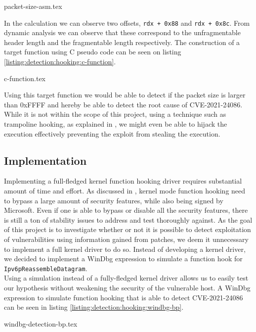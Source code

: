 \documentclass{report}
\begin{document}
{packet-size-asm.tex}

In the calculation we can observe two offsets, \texttt{rdx + 0x88} and \texttt{rdx + 0x8c}. From dynamic analysis we can observe that these correspond to the unfragmentable header length and the fragmentable length respectively. The construction of a target function using C pseudo code can be seen on listing \ref{listing:detection:hooking:c-function}.

{c-function.tex}

Using this target function we would be able to detect if the packet size is larger than 0xFFFF and hereby be able to detect the root cause of CVE-2021-24086. While it is not within the scope of this project, using a technique such as trampoline hooking, as explained in , we might even be able to hijack the execution effectively preventing the exploit from stealing the execution.

\subsection{Implementation}
Implementing a full-fledged kernel function hooking driver requires substantial amount of time and effort. As discussed in , kernel mode function hooking need to bypass a large amount of security features, while also being signed by Microsoft. Even if one is able to bypass or disable all the security features, there is still a ton of stability issues to address and test thoroughly against. As the goal of this project is to investigate whether or not it is possible to detect exploitation of vulnerabilities using information gained from patches, we deem it unnecessary to implement a full kernel driver to do so. Instead of developing a kernel driver, we decided to implement a WinDbg expression\cite{url:windbg:expression} to simulate a function hook for \texttt{Ipv6pReassembleDatagram}.
\\
Using a simulation instead of a fully-fledged kernel driver allows us to easily test our hypothesis without weakening the security of the vulnerable host. A WinDbg expression to simulate function hooking that is able to detect CVE-2021-24086 can be seen in listing \ref{listing:detection:hooking:windbg-bp}.

{windbg-detection-bp.tex}
\end{document}
